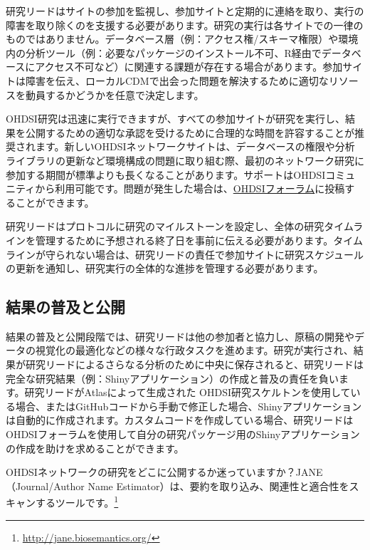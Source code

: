 \documentclass[
  11pt]{book}
\makeatletter
\newenvironment{kframe}{%
\medskip{}
\setlength{\fboxsep}{.8em}
 \def\at@end@of@kframe{}%
 \ifinner\ifhmode%
  \def\at@end@of@kframe{\end{minipage}}%
  \begin{minipage}{\columnwidth}%
 \fi\fi%
 \def\FrameCommand##1{\hskip\@totalleftmargin \hskip-\fboxsep
 \colorbox{myShadeColor}{##1}\hskip-\fboxsep
     \hskip-\linewidth \hskip-\@totalleftmargin \hskip\columnwidth}%
 \MakeFramed {\advance\hsize-\width
   \@totalleftmargin\z@ \linewidth\hsize
   \@setminipage}}%
 {\par\unskip\endMakeFramed%
 \at@end@of@kframe}
\newenvironment{rmdblock}[1]
  {
  \begin{itemize}
  \renewcommand{\labelitemi}{
    \raisebox{-.7\height}[0pt][0pt]{
      {\setkeys{Gin}{width=3em,keepaspectratio}\texttt{[image: images/\#1]}}
    }
  }
  \setlength{\fboxsep}{1em}
  \begin{kframe}
  \item
  }
  {
  \end{kframe}
  \end{itemize}
  }
\newenvironment{rmdimportant}
  {\begin{rmdblock}{important}}
  {\end{rmdblock}}
\theoremstyle{definition}
\theoremstyle{definition}
\theoremstyle{definition}
\theoremstyle{definition}
\theoremstyle{remark}
\makeatother
\begin{document}
研究リードはサイトの参加を監視し、参加サイトと定期的に連絡を取り、実行の障害を取り除くのを支援する必要があります。研究の実行は各サイトでの一律のものではありません。データベース層（例：アクセス権/スキーマ権限）や環境内の分析ツール（例：必要なパッケージのインストール不可、R経由でデータベースにアクセス不可など）に関連する課題が存在する場合があります。参加サイトは障害を伝え、ローカルCDMで出会った問題を解決するために適切なリソースを動員するかどうかを任意で決定します。

OHDSI研究は迅速に実行できますが、すべての参加サイトが研究を実行し、結果を公開するための適切な承認を受けるために合理的な時間を許容することが推奨されます。新しいOHDSIネットワークサイトは、データベースの権限や分析ライブラリの更新など環境構成の問題に取り組む際、最初のネットワーク研究に参加する期間が標準よりも長くなることがあります。サポートはOHDSIコミュニティから利用可能です。問題が発生した場合は、\href{http://forums.ohdsi.org}{OHDSIフォーラム}に投稿することができます。

研究リードはプロトコルに研究のマイルストーンを設定し、全体の研究タイムラインを管理するために予想される終了日を事前に伝える必要があります。タイムラインが守られない場合は、研究リードの責任で参加サイトに研究スケジュールの更新を通知し、研究実行の全体的な進捗を管理する必要があります。

\subsection{結果の普及と公開}\label{ux7d50ux679cux306eux666eux53caux3068ux516cux958b}

結果の普及と公開段階では、研究リードは他の参加者と協力し、原稿の開発やデータの視覚化の最適化などの様々な行政タスクを進めます。研究が実行され、結果が研究リードによるさらなる分析のために中央に保存されると、研究リードは完全な研究結果（例：Shinyアプリケーション）の作成と普及の責任を負います。研究リードがAtlasによって生成された OHDSI研究スケルトンを使用している場合、またはGitHubコードから手動で修正した場合、Shinyアプリケーションは自動的に作成されます。カスタムコードを作成している場合、研究リードはOHDSIフォーラムを使用して自分の研究パッケージ用のShinyアプリケーションの作成を助けを求めることができます。

\begin{rmdimportant}
OHDSIネットワークの研究をどこに公開するか迷っていますか？JANE（Journal/Author Name Estimator）は、要約を取り込み、関連性と適合性をスキャンするツールです。\footnote{\url{http://jane.biosemantics.org/}}
\end{rmdimportant}
\end{document}
